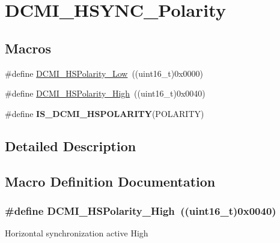 \hypertarget{group___d_c_m_i___h_s_y_n_c___polarity}{\section{D\-C\-M\-I\-\_\-\-H\-S\-Y\-N\-C\-\_\-\-Polarity}
\label{group___d_c_m_i___h_s_y_n_c___polarity}
}
\subsection*{Macros}
\begin{DoxyCompactItemize}
\item 
\#define \hyperlink{group___d_c_m_i___h_s_y_n_c___polarity_ga8be508108ba5f8982a63632c0525b105}{D\-C\-M\-I\-\_\-\-H\-S\-Polarity\-\_\-\-Low}~((uint16\-\_\-t)0x0000)
\item 
\#define \hyperlink{group___d_c_m_i___h_s_y_n_c___polarity_gab7d13846b01ffa41fdfc1987f0a91a67}{D\-C\-M\-I\-\_\-\-H\-S\-Polarity\-\_\-\-High}~((uint16\-\_\-t)0x0040)
\item 
\#define {\bfseries I\-S\-\_\-\-D\-C\-M\-I\-\_\-\-H\-S\-P\-O\-L\-A\-R\-I\-T\-Y}(P\-O\-L\-A\-R\-I\-T\-Y)
\end{DoxyCompactItemize}


\subsection{Detailed Description}


\subsection{Macro Definition Documentation}
\hypertarget{group___d_c_m_i___h_s_y_n_c___polarity_gab7d13846b01ffa41fdfc1987f0a91a67}{
\subsubsection[{D\-C\-M\-I\-\_\-\-H\-S\-Polarity\-\_\-\-High}]{\setlength{\rightskip}{0pt plus 5cm}\#define D\-C\-M\-I\-\_\-\-H\-S\-Polarity\-\_\-\-High~((uint16\-\_\-t)0x0040)}}\label{group___d_c_m_i___h_s_y_n_c___polarity_gab7d13846b01ffa41fdfc1987f0a91a67}
Horizontal synchronization active High 

